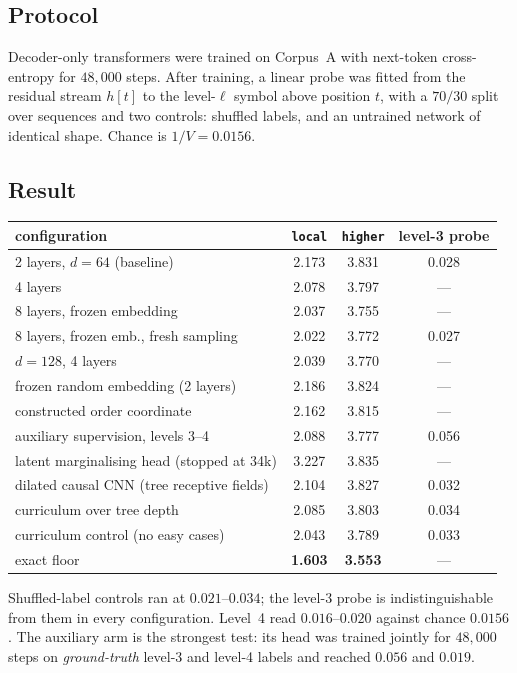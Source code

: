 \documentclass[11pt,a4paper]{article}
\theoremstyle{plain}
\theoremstyle{definition}
\begin{document}
\subsection{Protocol}

Decoder-only transformers were trained on Corpus~A with next-token
cross-entropy for $48{,}000$ steps. After training, a linear probe was fitted
from the residual stream $h[t]$ to the level-$\ell$ symbol above position $t$,
with a $70/30$ split over sequences and two controls: shuffled labels, and an
untrained network of identical shape. Chance is $1/V = 0.0156$.

\subsection{Result}

\begin{center}
\begin{tabular}{lccc}
\toprule
configuration & \texttt{local} & \texttt{higher} & level-3 probe \\
\midrule
2 layers, $d=64$ (baseline)      & 2.173 & 3.831 & 0.028 \\
4 layers                         & 2.078 & 3.797 & --- \\
8 layers, frozen embedding       & 2.037 & 3.755 & --- \\
8 layers, frozen emb., fresh sampling & 2.022 & 3.772 & 0.027 \\
$d=128$, 4 layers                & 2.039 & 3.770 & --- \\
frozen random embedding (2 layers) & 2.186 & 3.824 & --- \\
constructed order coordinate     & 2.162 & 3.815 & --- \\
auxiliary supervision, levels 3--4 & 2.088 & 3.777 & 0.056 \\
latent marginalising head (stopped at 34k) & 3.227 & 3.835 & --- \\
dilated causal CNN (tree receptive fields) & 2.104 & 3.827 & 0.032 \\
curriculum over tree depth       & 2.085 & 3.803 & 0.034 \\
curriculum control (no easy cases) & 2.043 & 3.789 & 0.033 \\
\midrule
exact floor                      & \textbf{1.603} & \textbf{3.553} & --- \\
\bottomrule
\end{tabular}
\end{center}

\noindent
Shuffled-label controls ran at $0.021$--$0.034$; the level-3 probe is
indistinguishable from them in every configuration. Level~4 read $0.016$--$0.020$
against chance $0.0156$. The auxiliary arm is the strongest test: its head was
trained jointly for $48{,}000$ steps on \emph{ground-truth} level-3 and level-4
labels and reached $0.056$ and $0.019$.
\end{document}
